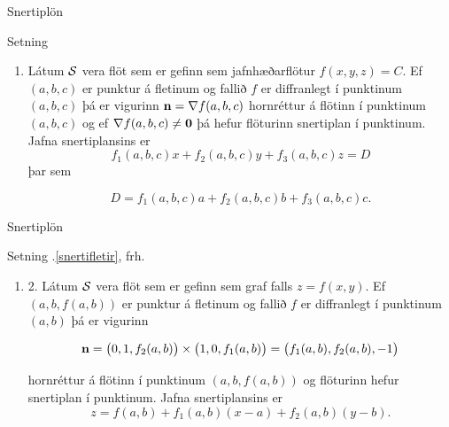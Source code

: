 \begin{frame}{Snertiplön} 

\begin {block}{Setning  }
\begin {enumerate}
 \item  Látum $\cal S$ vera flöt sem er gefinn sem jafnhæðarflötur 
     $f(x,y,z)=C$.   Ef $(a, b, c)$ er punktur á fletinum og
     fallið $f$ er diffranlegt í punktinum $(a, b,c)$ þá er vigurinn
     $\mbox{${\bf n}$}=\nabla f(a, b, c)$ hornréttur á flötinn í punktinum $(a,
    b, c)$ og ef $\nabla f(a, b, c)\neq \mbox{${\bf 0}$}$ þá hefur
flöturinn snertiplan í punktinum.  Jafna
     snertiplansins er
$$f_1(a, b, c)x+f_2(a, b, c)y+f_3(a, b, c)z=D$$ 
þar sem 

$$D= f_1(a, b, c)a+f_2(a, b, c)b
+f_3(a, b, c)c.$$

\end {enumerate}

\end{block}

\end{frame}

\begin{frame}{Snertiplön}
 \begin {block}{Setning \kaflanr.\ref{snertifletir}, frh.}
   \begin {enumerate}
    \item [2.] 
   Látum $\cal S$ vera flöt sem er gefinn sem graf falls 
     $z=f(x,y)$.   Ef $(a, b, f(a,b))$ er punktur á fletinum og
     fallið $f$ er diffranlegt í punktinum $(a, b)$ þá er vigurinn
     
     $$\mbox{${\bf n}$} =\big(0 ,1 ,f_2(a, b)\big)\times\big(1 ,0 ,f_1(a, b)\big)
=\big(f_1(a, b), f_2(a, b), -1\big)$$ 

hornréttur á flötinn í punktinum $(a,
     b, f(a,b))$ og flöturinn hefur snertiplan í punktinum.  Jafna
     snertiplansins er
$$z=f(a, b)+f_1(a, b)(x-a)+f_2(a, b)(y-b).$$
   \end {enumerate}

 \end {block}

\end{frame}

